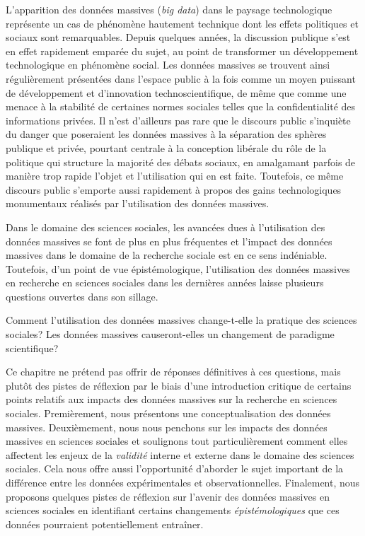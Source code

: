 \documentclass[
  letterpaper,
]{scrbook}
\begin{document}
L'apparition des données massives (\emph{big data}) dans le paysage
technologique représente un cas de phénomène hautement technique dont
les effets politiques et sociaux sont remarquables. Depuis quelques
années, la discussion publique s'est en effet rapidement emparée du
sujet, au point de transformer un développement technologique en
phénomène social. Les données massives se trouvent ainsi régulièrement
présentées dans l'espace public à la fois comme un moyen puissant de
développement et d'innovation technoscientifique, de même que comme une
menace à la stabilité de certaines normes sociales telles que la
confidentialité des informations privées. Il n'est d'ailleurs pas rare
que le discours public s'inquiète du danger que poseraient les données
massives à la séparation des sphères publique et privée, pourtant
centrale à la conception libérale du rôle de la politique qui structure
la majorité des débats sociaux, en amalgamant parfois de manière trop
rapide l'objet et l'utilisation qui en est faite. Toutefois, ce même
discours public s'emporte aussi rapidement à propos des gains
technologiques monumentaux réalisés par l'utilisation des données
massives.

Dans le domaine des sciences sociales, les avancées dues à l'utilisation
des données massives se font de plus en plus fréquentes et l'impact des
données massives dans le domaine de la recherche sociale est en ce sens
indéniable. Toutefois, d'un point de vue épistémologique, l'utilisation
des données massives en recherche en sciences sociales dans les
dernières années laisse plusieurs questions ouvertes dans son sillage.

Comment l'utilisation des données massives change-t-elle la pratique des
sciences sociales? Les données massives causeront-elles un changement de
paradigme scientifique?

Ce chapitre ne prétend pas offrir de réponses définitives à ces
questions, mais plutôt des pistes de réflexion par le biais d'une
introduction critique de certains points relatifs aux impacts des
données massives sur la recherche en sciences sociales. Premièrement,
nous présentons une conceptualisation des données massives.
Deuxièmement, nous nous penchons sur les impacts des données massives en
sciences sociales et soulignons tout particulièrement comment elles
affectent les enjeux de la \emph{validité} interne et externe dans le
domaine des sciences sociales. Cela nous offre aussi l'opportunité
d'aborder le sujet important de la différence entre les données
expérimentales et observationnelles. Finalement, nous proposons quelques
pistes de réflexion sur l'avenir des données massives en sciences
sociales en identifiant certains changements \emph{épistémologiques} que
ces données pourraient potentiellement entraîner.
\end{document}
